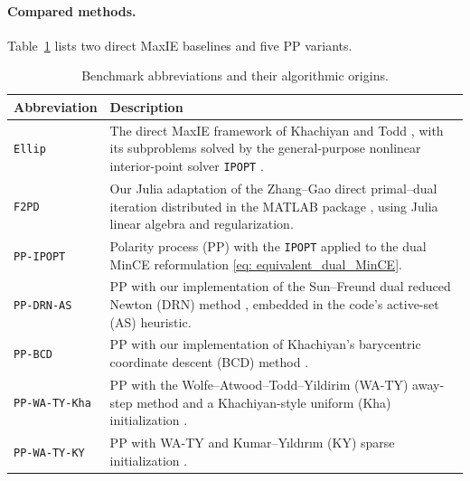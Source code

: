 \documentclass[smallextended]{svjour3}
\begin{document}
\paragraph{Compared methods.}
Table~\ref{tab:benchmark_methods} lists two direct MaxIE baselines and five PP
variants.
\begin{table}[!htbp]
\centering
\small
\begin{tabular}{@{}>{\raggedright\arraybackslash}p{}@{\hspace{1em}}>{\raggedright\arraybackslash}p{}@{}}
\toprule
Abbreviation & Description \\
\midrule
\texttt{Ellip} & The direct MaxIE framework of Khachiyan
and Todd \cite{khachiyan1990complexity}, with its subproblems solved by the
general-purpose nonlinear interior-point solver \texttt{IPOPT}
\cite{wachter2006implementation}. \\ \hline
\texttt{F2PD} & Our Julia adaptation of the Zhang--Gao direct primal--dual
iteration \cite{zhanggao2003mvie} distributed in the MATLAB package \cite{cousins2022volumeandsampling}, using
Julia linear algebra and regularization. \\ \hline
\texttt{PP-IPOPT} & Polarity process (PP) with the \texttt{IPOPT} applied to the dual MinCE reformulation
\eqref{eq: equivalent_dual_MinCE}. \\ \hline
\texttt{PP-DRN-AS} & PP with our implementation of the Sun--Freund dual
reduced Newton (DRN) method \cite{sunfreund2004mvce}, embedded in the code's
active-set (AS) heuristic. \\ \hline
\texttt{PP-BCD} & PP with our implementation of Khachiyan's barycentric
coordinate descent (BCD) method \cite{khachiyan1996rounding}. \\ \hline
\texttt{PP-WA-TY-Kha} & PP with the Wolfe--Atwood--Todd--Yildirim (WA-TY)
away-step method and a Khachiyan-style uniform (Kha) initialization
\cite{ahipasaoglu2008fw}. \\ \hline
\texttt{PP-WA-TY-KY} & PP with WA-TY and Kumar--Y{\i}ld{\i}r{\i}m
(KY) sparse initialization \cite{ahipasaoglu2008fw,kumar2005minimum}. \\
\bottomrule
\end{tabular}
\caption{Benchmark abbreviations and their algorithmic origins.}
\label{tab:benchmark_methods}
\end{table}
\end{document}
